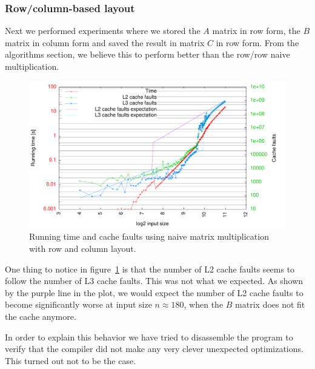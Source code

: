 \subsubsection{Row/column-based layout}
Next we performed experiments where we stored the $A$ matrix in row
form, the $B$ matrix in column form and saved the result in matrix $C$
in row form. From the algorithms section, we believe this to perform
better than the row/row naive multiplication.

\begin{figure}[h!]
  \centering
  \includegraphics[width=\textwidth]{plots/rowcol}
  \caption{Running time and cache faults using naive matrix
    multiplication with row and column layout.}
  \label{fig:rowcol}
\end{figure}

One thing to notice in figure~\ref{fig:rowcol} is that the number of
L2 cache faults seems to follow the number of L3 cache faults. This
was not what we expected. As shown by the purple line in the plot, we
would expect the number of L2 cache faults to become significantly
worse at input size $n \approx 180$, when the $B$ matrix does not fit
the cache anymore.

In order to explain this behavior we have tried to disassemble the
program to verify that the compiler did not make any very clever
unexpected optimizations. This turned out not to be the case.

